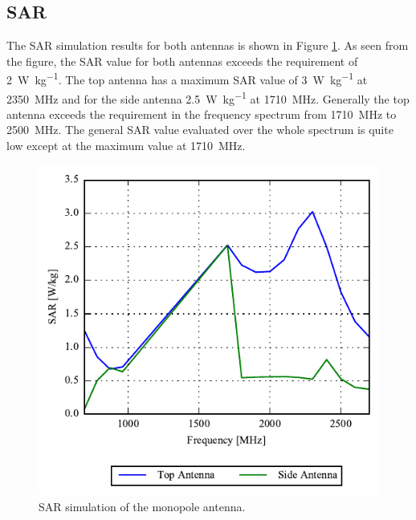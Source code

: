 \FloatBarrier
\subsection{SAR}
The SAR simulation results for both antennas is shown in Figure \ref{fig:sol1_sar}. As seen from the figure, the SAR value for both antennas exceeds the requirement of \SI{2}{W\per kg}. The top antenna has a maximum SAR value of \SI{3}{W\per kg} at \SI{2350}{MHz} and for the side antenna \SI{2.5}{W\per kg} at \SI{1710}{MHz}. Generally the top antenna exceeds the requirement in the frequency spectrum from \SI{1710}{MHz} to \SI{2500}{MHz}. The general SAR value evaluated over the whole spectrum is quite low except at the maximum value at \SI{1710}{MHz}. 

\begin{figure}[htbp]
    \centering
    \includegraphics{img/tech_sol/monopole/sar/sol1_sar.pdf}
    \caption{SAR simulation of the monopole antenna.}
    \label{fig:sol1_sar}
\end{figure}

